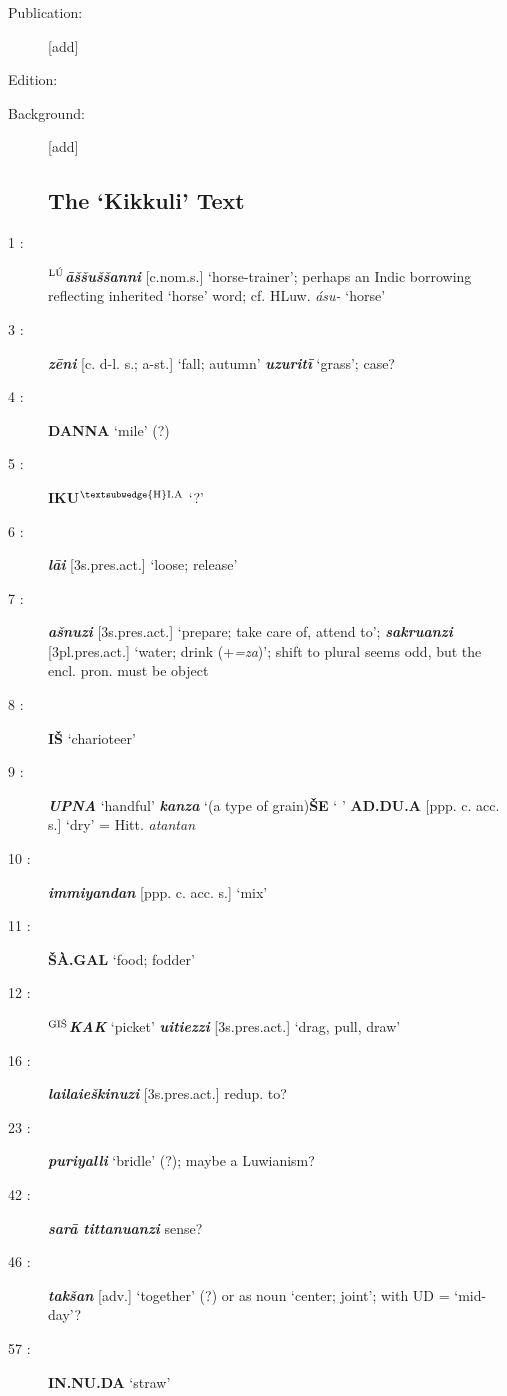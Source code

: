 \documentclass[10pt]{article}
\newcommand{\supersc}[1]{$^{\textrm{\scriptsize{#1}}}$}  	%
\newcommand{\bit}[1]{\textbf{\textit{#1}}}				%
\newcommand{\p}[1]{{\tiny[{#1}]}}					%
\newcommand{\hith}{\textsubwedge{h}}
\newcommand{\Hith}{\textsubwedge{H}}
\newcommand{\hpl}{\supersc{{\Hith}I.A}}
\newcommand{\man}{\supersc{L\'U}}
\newcommand{\wood}{\supersc{GI\v{S}}}
\renewcommand{\.}[1]{\textsubdot{#1}}
\begin{document}
\begin{description}
\item[Publication:] [add]
\item[Edition:] \citet{kammenhuber1961horse}
\item[Background:] [add] \\

\subsection{The `Kikkuli' Text}

\item[1 :] \textbf{{\man}}\bit{\=a\v{s}\v{s}u\v{s}\v{s}anni} \p{c.nom.s.} `horse-trainer'; perhaps an Indic borrowing reflecting inherited `horse' word; cf. HLuw. \textit{\'asu-} `horse'

\item[3 :] \bit{z\=eni} \p{c. d-l. s.; a-st.} `fall; autumn' \bit{uzu{\hith}rit\=i} `grass'; case?

\item[4 :] \textbf{DANNA} `mile' (?)

\item[5 :] \textbf{IKU{\hpl}} `?'

\item[6 :] \bit{l\=ai} \p{3s.pres.act.} `loose; release'

\item[7 :] \bit{a\v{s}nuzi} \p{3s.pres.act.} `prepare; take care of, attend to'; \bit{sakruanzi} \p{3pl.pres.act.} `water; drink (+\textit{=za})'; shift to plural seems odd, but the encl. pron. must be object

\item[8 :] \textbf{I\v{S}} `charioteer'

\item[9 :] \bit{UPNA} `handful' \bit{kanza} `(a type of grain)\textbf{\v{S}E} ` ' \textbf{{\Hith}AD.DU.A} \p{ppp. c. acc. s.} `dry' = Hitt. \textit{{\hith}atantan}

\item[10 :] \bit{immiyandan} \p{ppp. c. acc. s.} `mix'

\item[11 :] \textbf{\v{S}\`A.GAL} `food; fodder'

\item[12 :] \bit{{\wood}KAK} `picket' \bit{{\hith}uitiezzi} \p{3s.pres.act.} `drag, pull, draw'  

\item[16 :] \bit{la{\hith\hith}ila{\hith\hith}ie\v{s}kinuzi} \p{3s.pres.act.} redup. to?

\item[23 :] \bit{puriyalli} `bridle' (?); maybe a Luwianism?

\item[42 :] \bit{sar\=a tittanuanzi} sense?

\item[46 :] \bit{tak\v{s}an} \p{adv.} `together' (?) or as noun `center; joint'; with UD = `mid-day'?

\item[57 :] \textbf{IN.NU.DA} `straw'

\end{description}
\end{document}

